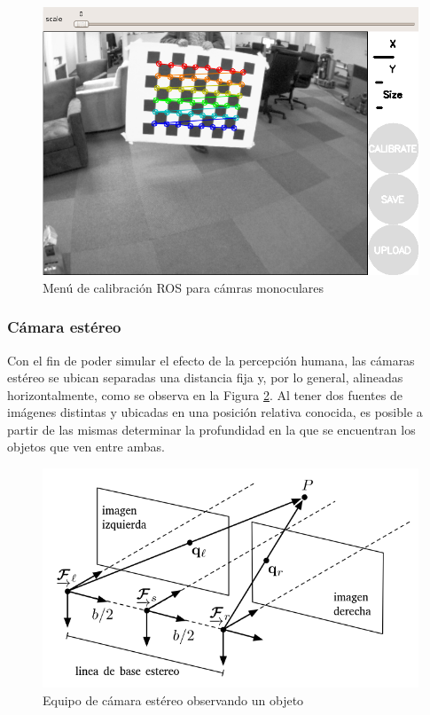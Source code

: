 \begin{figure}
    \centering
    \includegraphics[width=\linewidth]{Img/MonocularCameraCalibration.png}
    \caption{Menú de calibración ROS para cámras monoculares}
    \label{fig:monocularcameracalibration}
\end{figure}



\subsubsection{Cámara estéreo}
Con el fin de poder simular el efecto de la percepción humana, las cámaras estéreo se ubican separadas una distancia fija y, por lo general, alineadas horizontalmente, como se observa en la Figura \ref{fig:stereocamerarig}. Al tener dos fuentes de imágenes distintas y ubicadas en una posición relativa conocida, es posible a partir de las mismas determinar la profundidad en la que se encuentran los objetos que ven entre ambas. 
\begin{figure}[!ht]
    \centering
    \includegraphics[width=\linewidth]{Img/StereoCameraRig.png}
    \caption{Equipo de cámara estéreo observando un objeto}
    \label{fig:stereocamerarig}
\end{figure}

